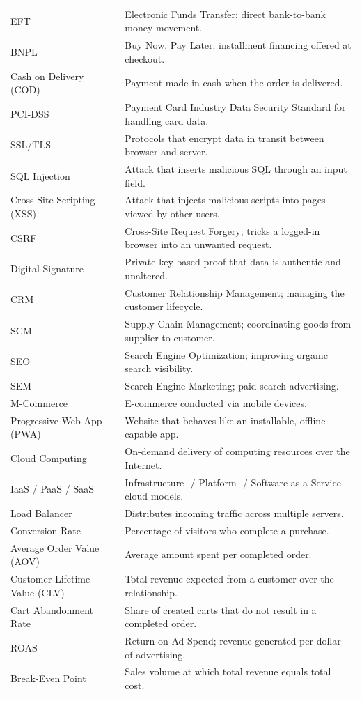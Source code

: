 \documentclass[11pt,a4paper]{article}
\begin{document}
\begin{longtable}{@{}p{3.3cm}p{10.2cm}@{}}
\addlinespace
EFT & Electronic Funds Transfer; direct bank-to-bank money movement. \\
\addlinespace
BNPL & Buy Now, Pay Later; installment financing offered at checkout. \\
\addlinespace
Cash on Delivery (COD) & Payment made in cash when the order is delivered. \\
\addlinespace
PCI-DSS & Payment Card Industry Data Security Standard for handling card data. \\
\addlinespace
SSL/TLS & Protocols that encrypt data in transit between browser and server. \\
\addlinespace
SQL Injection & Attack that inserts malicious SQL through an input field. \\
\addlinespace
Cross-Site Scripting (XSS) & Attack that injects malicious scripts into pages viewed by other users. \\
\addlinespace
CSRF & Cross-Site Request Forgery; tricks a logged-in browser into an unwanted request. \\
\addlinespace
Digital Signature & Private-key-based proof that data is authentic and unaltered. \\
\addlinespace
CRM & Customer Relationship Management; managing the customer lifecycle. \\
\addlinespace
SCM & Supply Chain Management; coordinating goods from supplier to customer. \\
\addlinespace
SEO & Search Engine Optimization; improving organic search visibility. \\
\addlinespace
SEM & Search Engine Marketing; paid search advertising. \\
\addlinespace
M-Commerce & E-commerce conducted via mobile devices. \\
\addlinespace
Progressive Web App (PWA) & Website that behaves like an installable, offline-capable app. \\
\addlinespace
Cloud Computing & On-demand delivery of computing resources over the Internet. \\
\addlinespace
IaaS / PaaS / SaaS & Infrastructure- / Platform- / Software-as-a-Service cloud models. \\
\addlinespace
Load Balancer & Distributes incoming traffic across multiple servers. \\
\addlinespace
Conversion Rate & Percentage of visitors who complete a purchase. \\
\addlinespace
Average Order Value (AOV) & Average amount spent per completed order. \\
\addlinespace
Customer Lifetime Value (CLV) & Total revenue expected from a customer over the relationship. \\
\addlinespace
Cart Abandonment Rate & Share of created carts that do not result in a completed order. \\
\addlinespace
ROAS & Return on Ad Spend; revenue generated per dollar of advertising. \\
\addlinespace
Break-Even Point & Sales volume at which total revenue equals total cost. \\
\bottomrule
\end{longtable}
\end{document}
